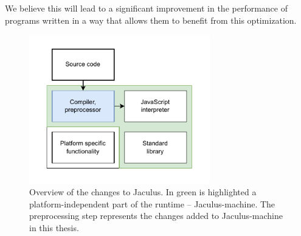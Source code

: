 We believe this will lead to a significant improvement in the performance of programs written in a way that allows them to benefit from this optimization.

\begin{figure}[!b]
    \centering
    \includegraphics[width=0.7\textwidth, draft=false]{assets/img/overview.pdf}
    \caption{Overview of the changes to Jaculus. In green is highlighted a platform-independent part of the runtime -- Jaculus-machine. The preprocessing step represents the changes added to Jaculus-machine in this thesis.}
    \label{fig:overview}
\end{figure}
